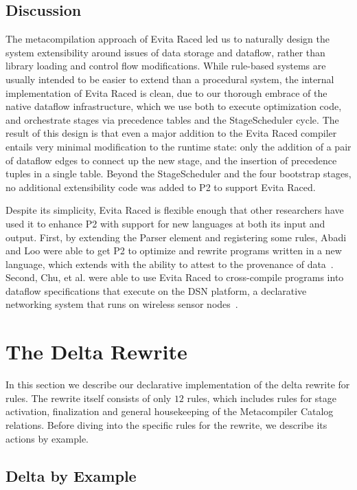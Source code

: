 \subsection{Discussion}

The metacompilation approach of Evita Raced led us to naturally design the
system extensibility around issues of data storage and dataflow, rather than
library loading and control flow modifications.  While rule-based systems are
usually intended to be easier to extend than a procedural system, the internal
implementation of Evita Raced is clean, due to our thorough embrace of the
native dataflow infrastructure, which we use both to execute optimization code,
and orchestrate stages via precedence tables and the StageScheduler cycle.  The
result of this design is that even a major addition to the Evita Raced compiler
entails very minimal modification to the runtime state: only the addition of a
pair of dataflow edges to connect up the new stage, and the insertion of
precedence tuples in a single table.  Beyond the StageScheduler and the four
bootstrap stages, no additional extensibility code was added to P2 to support
Evita Raced.

Despite its simplicity, Evita Raced is flexible enough that other researchers
have used it to enhance P2 with support for new languages at both its input and
output.  First, by extending the Parser element and registering some \OVERLOG
rules, Abadi and Loo were able to get P2 to optimize and rewrite programs
written in a new language, which extends \OVERLOG with the ability to attest to
the provenance of data~\cite{abadi-netdb07}.  Second, Chu, et al.  were able to
use Evita Raced to cross-compile \OVERLOG programs into dataflow specifications
that execute on the DSN platform, a declarative networking system that runs on
wireless sensor nodes~\cite{chu-sensys07}.


\section{The Delta Rewrite}
\label{ch:evita:sec:delta}

In this section we describe our declarative implementation of the delta rewrite
for \OVERLOG rules.  The rewrite itself consists of only $12$ rules, which
includes rules for stage activation, finalization and general housekeeping of
the Metacompiler Catalog relations.  Before diving into the specific rules for
the rewrite, we describe its actions by example.

\subsection{Delta by Example}

